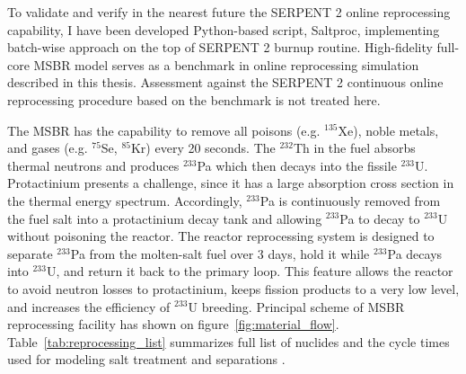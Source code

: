 To validate and verify in the nearest future the SERPENT 2 online reprocessing capability, I have been developed Python-based script, Saltproc, implementing batch-wise approach on the top of SERPENT 2 burnup routine. High-fidelity full-core \gls{MSBR} model serves as a benchmark in online reprocessing simulation described in this thesis. Assessment against the SERPENT 2 continuous online reprocessing procedure based on the benchmark is not treated here.

The \gls{MSBR} has the capability to remove all poisons (e.g. $^{135}$Xe), noble metals, and gases (e.g. $^{75}$Se, $^{85}$Kr) every 20 seconds. The $^{232}$Th in the fuel absorbs thermal neutrons and produces $^{233}$Pa which then decays into the fissile $^{233}$U. Protactinium presents a challenge, since it has a large absorption cross section in the thermal energy spectrum. Accordingly, $^{233}$Pa is continuously removed from the fuel salt into a protactinium decay tank and allowing $^{233}$Pa to decay to $^{233}$U without poisoning the reactor. The reactor reprocessing system is designed to separate $^{233}$Pa from the molten-salt fuel over 3 days, hold it while $^{233}$Pa decays into $^{233}$U, and return it back to the primary loop. This feature allows the reactor to avoid neutron losses to protactinium, keeps fission products to a very low level, and 
increases the efficiency of $^{233}$U breeding. Principal scheme of \gls{MSBR} reprocessing facility has shown on figure~\ref{fig:material_flow}. Table~\ref{tab:reprocessing_list} summarizes full list of nuclides and the cycle times used for modeling salt treatment and separations \cite{robertson_conceptual_1971}. 

